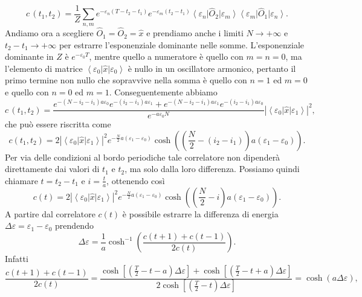 \documentclass{article}
\begin{document}
\begin{equation}
    c\,(t_1, t_2)=\frac{1}{Z}\sum_{n,m} e^{-\varepsilon_n(T-t_2-t_1)}e^{-\varepsilon_m(t_2-t_1)}\left<\varepsilon_n\right|\hat{O}_2\left|\varepsilon_m\right>\left<\varepsilon_m\right|\hat{O}_1\left|\varepsilon_n\right>.
\end{equation}
Andiamo ora a scegliere $\hat{O}_1=\hat{O}_2=\hat{x}$ e prendiamo anche i limiti $N\rightarrow+\infty$ e $t_2-t_1\rightarrow+\infty$ per estrarre l'esponenziale dominante nelle somme. L'esponenziale dominante in $Z$ è $e^{-\varepsilon_0T}$, mentre quello a numeratore è quello con $m=n=0$, ma l'elemento di matrice $\left<\varepsilon_0\right|\hat{x}\left|\varepsilon_0\right>$ è nullo in un oscillatore armonico, pertanto il primo termine non nullo che sopravvive nella somma è quello con $n=1$ ed $m=0$ e quello con $n=0$ ed $m=1$. Conseguentemente abbiamo 
\begin{equation}
    c\,(t_1,t_2)=\frac{e^{-(N-i_2-i_1)a\varepsilon_0}e^{-(i_2-i_1)a\varepsilon_1}+e^{-(N-i_2-i_1)a\varepsilon_1}e^{-(i_2-i_1)a\varepsilon_0}}{e^{-a\varepsilon_0N}}\left|\left<\varepsilon_0\right|\hat{x}\left|\varepsilon_1\right>\right|^2,
\end{equation}
 che può essere riscritta come 
 \begin{equation}
    c(t_1,t_2)=2\left|\left<\varepsilon_0\right|\hat{x}\left|\varepsilon_1\right>\right|^2e^{-\frac{N}{2}a(\varepsilon_1-\varepsilon_0)}\cosh\left(\left(\frac{N}{2}-(i_2-i_1)\right)a(\varepsilon_1-\varepsilon_0)\right).
 \end{equation}
Per via delle condizioni al bordo periodiche tale correlatore non dipenderà direttamente dai valori di $t_1$ e $t_2$, ma solo dalla loro differenza. Possiamo quindi chiamare $t=t_2-t_1$ e $i=\frac{t}{a}$, ottenendo così
\begin{equation}
    \label{ho fame}
    c(t)=2\left|\left<\varepsilon_0\right|\hat{x}\left|\varepsilon_1\right>\right|^2e^{-\frac{N}{2}a(\varepsilon_1-\varepsilon_0)}\cosh\left(\left(\frac{N}{2}-i\right)a(\varepsilon_1-\varepsilon_0)\right).
\end{equation}
A partire dal correlatore $c(t)$ è possibile estrarre la differenza di energia $\Delta\varepsilon=\varepsilon_1-\varepsilon_0$ prendendo
\begin{equation}
    \label{nuvola}
    \Delta\varepsilon=\frac{1}{a}\cosh^{-1}\left(\frac{c(t+1)+c(t-1)}{2c(t)}\right).
\end{equation}
Infatti 
$$\frac{c(t+1)+c(t-1)}{2c(t)}=\frac{\cosh\left[\left(\frac{T}{2}-t-a\right)\Delta\varepsilon\right]+\cosh\left[\left(\frac{T}{2}-t+a\right)\Delta\varepsilon\right]}{2\cosh\left[\left(\frac{T}{2}-t\right)\Delta\varepsilon\right]}=\cosh(a\Delta\varepsilon),$$
\end{document}
